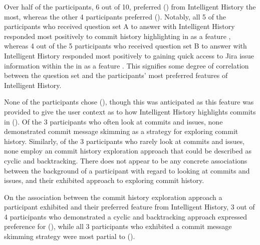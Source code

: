 Over half of the participants, 6 out of 10, preferred () from Intelligent History the most,
whereas the other 4 participants preferred ().
Notably, all 5 of the participants who received question set A to answer with Intelligent History responded most positively to commit history highlighting in  as a feature , 
whereas 4 out of the 5 participants who received question set B to answer with Intelligent History responded most positively to gaining quick access to Jira issue information within the  in  as a feature .
This signifies some degree of correlation between the question set and the participants' most preferred features of Intelligent History.

None of the participants chose (), though this was anticipated as this feature was provided to give the user context as to how Intelligent History highlights commits in ().
Of the 3 participants who often look at commits and issues, none demonstrated commit message skimming as a strategy for exploring commit history.
Similarly, of the 3 participants who rarely look at commits and issues, none employ an commit history exploration approach that could be described as cyclic and backtracking.
There does not appear to be any concrete associations between the background of a participant with regard to looking at commits and issues,
and their exhibited approach to exploring commit history.

On the association between the commit history exploration approach a participant exhibited and their preferred feature from Intelligent History,
3 out of 4 participants who demonstrated a cyclic and backtracking approach expressed preference for (),
while all 3 participants who exhibited a commit message skimming strategy were most partial to ().

